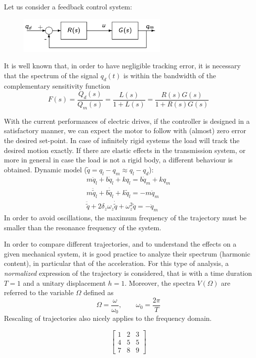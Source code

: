 \documentclass{book}
\begin{document}
Let us consider a feedback control system:
\begin{figure}[H]
    \begin{center}
        \includegraphics[width=0.65\textwidth]{compsens}
    \end{center}
\end{figure}
It is well known that, in order to have negligible tracking error, it is necessary that the spectrum of the signal $q_d(t)$ is within the bandwidth of the complementary sensitivity function 
\[
    F(s)=\displaystyle\frac{Q_d(s)}{Q_m(s)}=\displaystyle\frac{L(s)}{1+L(s)}=\displaystyle\frac{R(s)G(s)}{1+R(s)G(s)}
\]

With the current performances of electric drives, if the controller is designed in a satisfactory manner, we can expect the motor to follow with (almost) zero error the desired set-point. In case of infinitely rigid systems the load will track the desired motion exactly. If there are elastic effects in the transmission system, or more in general in case the load is not a rigid body, a different behaviour is obtained. 
Dynamic model ($\tilde{q}=q_l-q_m\approx q_l-q_d$):
\begin{gather*}
    m\ddot{q}_l+b\dot{q}_l+kq_l = b\dot{q}_m+kq_m\\
    m\ddot{\tilde{q}}_l+b\dot{\tilde{q}}_l+k\tilde{q}_l = -m\ddot{q}_m\\
    \ddot{\tilde{q}}+2\delta_z\omega_z\dot{\tilde{q}}+\omega_z^2\tilde{q} = -\ddot{q}_m
\end{gather*}
In order to avoid oscillations, the maximum frequency of the trajectory must be smaller than the resonance frequency of the system. 

In order to compare different trajectories, and to understand the effects on a given mechanical system, it is good practice to analyze their spectrum (harmonic content), in particular that of the acceleration. For this type of analysis, a \emph{normalized} expression of the trajectory is considered, that is with a time duration $T=1$ and a unitary displacement $h=1$. Moreover, the spectra $V(\Omega)$ are referred to the variable $\Omega$ defined as 
\[
    \Omega = \displaystyle\frac{\omega}{\omega_0}, \qquad \omega_0=\displaystyle\frac{2\pi}{T}
\]
Rescaling of trajectories also nicely applies to the frequency domain. 



\[
    \begin{bmatrix}
        1 & 2 & 3 \\
        4 & 5 & 5 \\
        7 & 8 & 9
    \end{bmatrix}
\]
\end{document}

